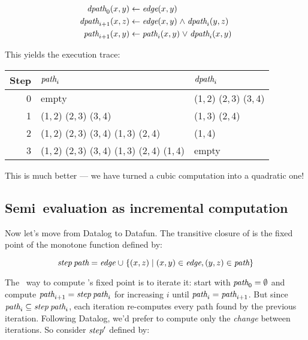 \begin{align*}
  \name{dpath}_0(x,y) &\gets \name{edge}(x,y)
  \\
  \name{dpath}_{i+1}(x,z) &\gets \name{edge}(x,y) \wedge \name{dpath}_i(y,z)
  \\
  \name{path}_{i+1}(x,y) &\gets \name{path}_i(x,y) \vee \name{dpath}_i(x,y)
\end{align*}

\noindent This yields the execution trace:

\begin{center}
  \setlength\tabcolsep{1em}
  \begin{tabular}{@{}rll@{}}
    Step & $\text{\itshape path}_i$ & $\text{\itshape dpath}_i$
    \\\midrule
    0 & empty & (1,\,2) (2,\,3) (3,\,4)
    \\
    1 & (1,\,2) (2,\,3) (3,\,4) & (1,\,3) (2,\,4)
    \\
    2 & (1,\,2) (2,\,3) (3,\,4) (1,\,3) (2,\,4) & (1,\,4)
    \\
    3 & (1,\,2) (2,\,3) (3,\,4) (1,\,3) (2,\,4) (1,\,4) & empty
  \end{tabular}
\end{center}

\noindent
This is much better --- we have turned a cubic computation into a quadratic one!


\subsection{Semi\naive\ evaluation as incremental computation}
\label{sec:seminaive-tc-in-datafun}

Now let's move from Datalog to Datafun. The transitive closure of  is
the fixed point of the monotone function  defined by:

\[
\name{step} \<\name{path} = \name{edge} \cup
\setfor{(x,z)}{(x,y) \in \name{edge}, (y,z) \in \name{path}}
\]

\noindent
The \naive\ way to compute 's fixed point is to iterate it: start
with \(\text{\itshape path}_0 = \emptyset\) and compute \(\name{path}_{i+1} =
\name{step}\<\name{path}_i\) for increasing $i$ until \(\text{\itshape path}_i =
\text{\itshape path}_{i+1}\).
%
But since $\name{path}_i \subseteq \name{step}\<\name{path}_i$, each iteration
re-computes every path found by the previous iteration.
%
Following Datalog, we'd prefer to compute only the \emph{change} between
iterations.
%
So consider $\text{\itshape step}'$ defined by:

